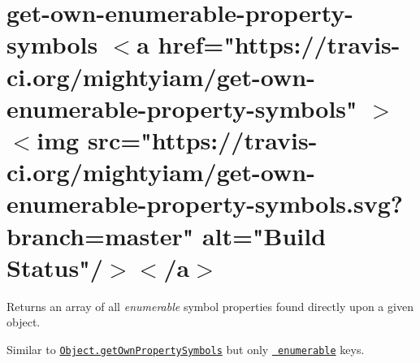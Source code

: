 \chapter{get-\/own-\/enumerable-\/property-\/symbols \texorpdfstring{$<$}{<}a href="{}https\+://travis-\/ci.\+org/mightyiam/get-\/own-\/enumerable-\/property-\/symbols"{} \texorpdfstring{$>$}{>}\texorpdfstring{$<$}{<}img src="{}https\+://travis-\/ci.\+org/mightyiam/get-\/own-\/enumerable-\/property-\/symbols.\+svg?branch=master"{} alt="{}\+Build Status"{}/\texorpdfstring{$>$}{>}\texorpdfstring{$<$}{<}/a\texorpdfstring{$>$}{>}}
\hypertarget{md_node__modules_2get-own-enumerable-property-symbols_2README}{}\label{md_node__modules_2get-own-enumerable-property-symbols_2README}
\label{md_node__modules_2get-own-enumerable-property-symbols_2README_autotoc_md14437}%
%
 Returns an array of all {\itshape enumerable} symbol properties found directly upon a given object.

Similar to \href{https://developer.mozilla.org/en-US/docs/Web/JavaScript/Reference/Global_Objects/Object/getOwnPropertySymbols}{\texttt{ {\ttfamily Object.\+get\+Own\+Property\+Symbols}}} but only \href{https://developer.mozilla.org/en-US/docs/Web/JavaScript/Enumerability_and_ownership_of_properties}{\texttt{ enumerable}} keys.


\begin{DoxyCode}{0}
\DoxyCodeLine{}
\DoxyCodeLine{//\ [Symbol()]}
\DoxyCodeLine{//\ []}

\end{DoxyCode}
 